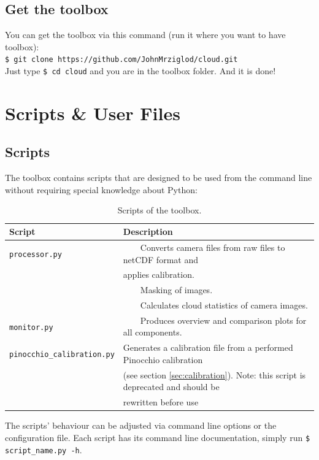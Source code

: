 \documentclass[11pt,a4paper]{article}
\newcommand{\tabitem}{~~\llap{\textbullet}~~}
\begin{document}
\subsection{Get the \cloud toolbox}
You can get the \cloud toolbox via this command (run it where you want to have \cloud toolbox):\\
\texttt{\$ git clone https://github.com/JohnMrziglod/cloud.git}\\

Just type \texttt{\$ cd cloud} and you are in the toolbox folder. And it is done!

\section{Scripts \& User Files}
\label{sec:scripts-and-files}
\subsection{Scripts}
\label{sec:scripts}
The \cloud toolbox contains scripts that are designed to be used from the command line without requiring special knowledge about Python:

\begin{table}[h!]
	\centering
	\caption{Scripts of the \cloud toolbox.}
	\begin{tabular}{|l|l|}
	\hline 
	\textbf{Script} & \textbf{Description}\\ 
	\hline \hline 
	\texttt{processor.py} & \tabitem Converts camera files from raw files to netCDF format and\\ 
	& applies calibration.\\
	& \tabitem Masking of images.\\
	& \tabitem Calculates cloud statistics of camera images.\\ 
	\hline 
	\texttt{monitor.py} & \tabitem Produces overview and comparison plots for all components.\\ 
	\hline 
	\texttt{pinocchio\_calibration.py} &  Generates a calibration file from a performed Pinocchio calibration\\
	& (see section \ref{sec:calibration}). Note: this script is deprecated and should be\\
	& rewritten before use\\
	\hline
	\end{tabular} 
\end{table}

The scripts' behaviour can be adjusted via command line options or the configuration file. Each script has its command line documentation, simply run \texttt{\$ script\_name.py -h}.
\end{document}
